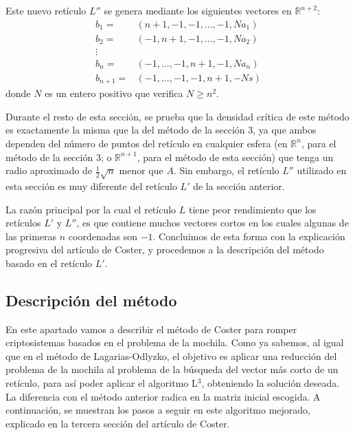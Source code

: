     Este nuevo retículo $L''$ se genera mediante los siguientes vectores en $\mathbb{R}^{n+2}$:
    \begin{align}
        b_{1} =& (n+1, -1, -1, ... , -1, Na_{1}) \\
        b_{2} =& (-1, n+1, -1, ... , -1, Na_{2}) \\
        \vdots&                          \\
        b_{n} =& (-1, ... , -1, n+1, -1, Na_{n}) \\
        b_{n+1} =& (-1, ... , -1, -1, n+1, -Ns)
    \end{align}
    donde $N$ es un entero positivo que verifica $N \geq n^{2}$.

    Durante el resto de esta sección, se prueba que la densidad crítica de este método es exactamente la misma que la del método de la sección $3$, ya que ambos dependen del número de puntos del retículo en cualquier esfera (en $\mathbb{R}^{n}$, para el método de la sección $3$; o $\mathbb{R}^{n+1}$, para el método de esta sección) que tenga un radio aproximado de $\frac{1}{2}\sqrt{n}$ menor que $A$. Sin embargo, el retículo $L''$ utilizado en esta sección es muy diferente del retículo $L'$ de la sección anterior.

    La razón principal por la cual el retículo $L$ tiene peor rendimiento que los retículos $L'$ y $L''$, es que contiene muchos vectores cortos en los cuales algunas de las primeras $n$ coordenadas son $-1$. Concluimos de esta forma con la explicación progresiva del artículo de Coster, y procedemos a la descripción del método basado en el retículo $L'$.

    \subsection{Descripción del método}

    En este apartado vamos a describir el método de Coster para romper criptosistemas basados en el problema de la mochila. Como ya sabemos, al igual que en el método de Lagarias-Odlyzko, el objetivo es aplicar una reducción del problema de la mochila al problema de la búsqueda del vector más corto de un retículo, para así poder aplicar el algoritmo L$^{3}$, obteniendo la solución deseada. La diferencia con el método anterior radica en la matriz inicial escogida. A continuación, se muestran los pasos a seguir en este algoritmo mejorado, explicado en la tercera sección del artículo de Coster.
    
